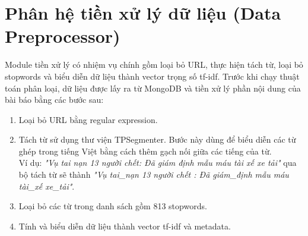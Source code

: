 \section{Phân hệ tiền xử lý dữ liệu (Data Preprocessor)}
\label{sec:DataPreprocessor}
Module tiền xử lý có nhiệm vụ chính gồm loại bỏ URL, thực hiện tách từ, loại bỏ stopwords và biểu diễn dữ liệu thành vector trọng số tf-idf. Trước khi chạy thuật toán phân loại, dữ liệu được lấy ra từ MongoDB và tiền xử lý phần nội dung của bài báo bằng các bước sau:
	\begin{enumerate}
		\item Loại bỏ URL bằng regular expression.
		\item Tách từ sử dụng thư viện TPSegmenter. Bước này dùng để biểu diễn các từ ghép trong tiếng Việt bằng cách thêm gạch nối giữa các tiếng của từ.\\
		Ví dụ: \textit{"Vụ tai nạn 13 người chết: Đã giám định mẫu máu tài xế xe tải"} qua bộ tách từ sẽ thành \textit{"Vụ tai\_nạn 13 người chết : Đã giám\_định mẫu máu tài\_xế xe\_tải"}.
		\item Loại bỏ các từ trong danh sách gồm 813 stopwords.
		\item Tính và biểu diễn dữ liệu thành vector tf-idf và metadata.
	\end{enumerate}

